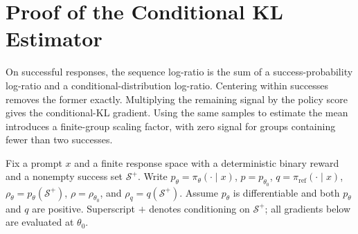 \section{Proof of the Conditional KL Estimator}
\label{app:ckl-estimator}

\begin{insight}
On successful responses, the sequence log-ratio is the sum of a
success-probability log-ratio and a conditional-distribution log-ratio.
Centering within successes removes the former exactly. Multiplying the
remaining signal by the policy score gives the conditional-KL gradient.
Using the same samples to estimate the mean introduces a finite-group
scaling factor, with zero signal for groups containing fewer than two successes.
\end{insight}

Fix a prompt $x$ and a finite response space with a deterministic binary
reward and a nonempty success set $\mathcal S^+$.
Write $p_\theta=\pi_\theta(\cdot\mid x)$, $p=p_{\theta_0}$,
$q=\pi_{\mathrm{ref}}(\cdot\mid x)$, $\rho_\theta=p_\theta(\mathcal S^+)$,
$\rho=\rho_{\theta_0}$, and $\rho_q=q(\mathcal S^+)$.
Assume $p_\theta$ is differentiable and both $p_\theta$ and $q$ are positive.
Superscript $+$ denotes conditioning on $\mathcal S^+$;
all gradients below are evaluated at $\theta_0$.

